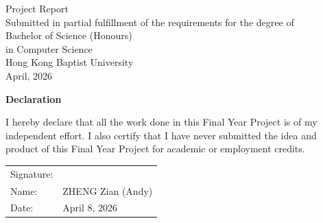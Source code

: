 \documentclass[11pt,a4paper]{report}
\begin{document}
\begin{titlepage}
\centering
\vspace*{1cm}

{\large Project Report}\\[0.5cm]
Submitted in partial fulfillment of the requirements for the degree of\\[0.3cm]
{\large Bachelor of Science (Honours)}\\[0.3cm]
{\large in Computer Science}\\[0.5cm]
{\large Hong Kong Baptist University}\\[0.3cm]
{\large April, 2026}\\[1.5cm]


\restoregeometry
\end{titlepage}

\newpage
\thispagestyle{empty}
\begin{center}
\vspace*{5cm}
{\Large\bfseries Declaration}
\end{center}
\vspace{2cm}
I hereby declare that all the work done in this Final Year Project is of my independent effort. I also certify that I have never submitted the idea and product of this Final Year Project for academic or employment credits.

\vspace{3cm}
\noindent
\begin{tabular}{ll}
Signature: & \underline{\hspace{6cm}} \\[1cm]
Name: & ZHENG Zian (Andy) \\[1cm]
Date: & April 8, 2026 \\
\end{tabular}
\newpage

\end{document}
